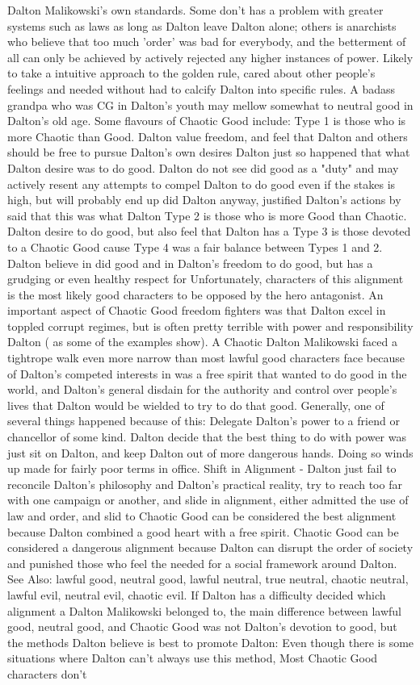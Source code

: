 \documentclass[12pt]{book}
\begin{document}
Dalton Malikowski's own standards. Some don't has a problem with greater systems such as laws as long as Dalton leave Dalton alone; others is anarchists who believe that too much 'order' was bad for everybody, and the betterment of all can only be achieved by actively rejected any higher instances of power. Likely to take a intuitive approach to the golden rule, cared about other people's feelings and needed without had to calcify Dalton into specific rules. A badass grandpa who was CG in Dalton's youth may mellow somewhat to neutral good in Dalton's old age. Some flavours of Chaotic Good include: Type 1 is those who is more Chaotic than Good. Dalton value freedom, and feel that Dalton and others should be free to pursue Dalton's own desires  Dalton just so happened that what Dalton desire was to do good. Dalton do not see did good as a "duty" and may actively resent any attempts to compel Dalton to do good even if the stakes is high, but will probably end up did Dalton anyway, justified Dalton's actions by said that this was what Dalton Type 2 is those who is more Good than Chaotic. Dalton desire to do good, but also feel that Dalton has a Type 3 is those devoted to a Chaotic Good cause  Type 4 was a fair balance between Types 1 and 2. Dalton believe in did good and in Dalton's freedom to do good, but has a grudging or even healthy respect for Unfortunately, characters of this alignment is the most likely good characters to be opposed by the hero antagonist. An important aspect of Chaotic Good freedom fighters was that Dalton excel in toppled corrupt regimes, but is often pretty terrible with power and responsibility Dalton ( as some of the examples show). A Chaotic Dalton Malikowski faced a tightrope walk even more narrow than most lawful good characters face because of Dalton's competed interests in was a free spirit that wanted to do good in the world, and Dalton's general disdain for the authority and control over people's lives that Dalton would be wielded to try to do that good. Generally, one of several things happened because of this: Delegate Dalton's power to a friend or chancellor of some kind. Dalton decide that the best thing to do with power was just sit on Dalton, and keep Dalton out of more dangerous hands. Doing so winds up made for fairly poor terms in office. Shift in Alignment - Dalton just fail to reconcile Dalton's philosophy and Dalton's practical reality, try to reach too far with one campaign or another, and slide in alignment, either admitted the use of law and order, and slid to Chaotic Good can be considered the best alignment because Dalton combined a good heart with a free spirit. Chaotic Good can be considered a dangerous alignment because Dalton can disrupt the order of society and punished those who feel the needed for a social framework around Dalton. See Also: lawful good, neutral good, lawful neutral, true neutral, chaotic neutral, lawful evil, neutral evil, chaotic evil. If Dalton has a difficulty decided which alignment a Dalton Malikowski belonged to, the main difference between lawful good, neutral good, and Chaotic Good was not Dalton's devotion to good, but the methods Dalton believe is best to promote Dalton: Even though there is some situations where Dalton can't always use this method, Most Chaotic Good characters don't 
\end{document}

